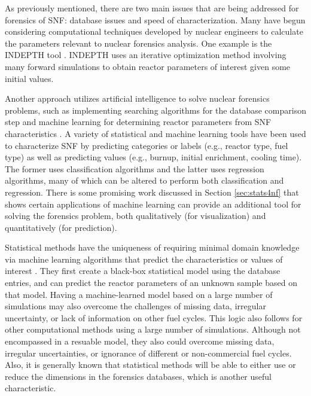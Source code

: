 As previously mentioned, there are two main issues that are being addressed for
forensics of \gls{SNF}: database issues and speed of characterization.  Many
have begun considering computational techniques developed by nuclear engineers
to calculate the parameters relevant to nuclear forensics analysis.  One
example is the \gls{INDEPTH} tool \cite{weber_2006, weber_2010, weber_2011}.
\gls{INDEPTH} uses an iterative optimization method involving many forward
simulations to obtain reactor parameters of interest given some initial values. 

Another approach utilizes artificial intelligence to solve nuclear forensics
problems, such as implementing searching algorithms for the database comparison
step \cite{gey_search} and machine learning for determining reactor parameters
from \gls{SNF} characteristics \cite{dayman_feasibility_2013, nicolaou_2006,
nicolaou_2009, nicolaou_2014, robel_2009, pu_discrimination, jones_viz_2014,
jones_snf_2014}.  A variety of statistical and machine learning tools have been
used to characterize \gls{SNF} by predicting categories or labels (e.g.,
reactor type, fuel type) as well as predicting values (e.g., burnup, initial
enrichment, cooling time). The former uses classification algorithms and the
latter uses regression algorithms, many of which can be altered to perform both
classification and regression.  There is some promising work discussed in
Section \ref{sec:stats4nf} that shows certain applications of machine learning
can provide an additional tool for solving the forensics problem, both
qualitatively (for visualization) and quantitatively (for prediction).

Statistical methods have the uniqueness of requiring minimal domain knowledge
via machine learning algorithms that predict the characteristics or values of
interest \cite{dayman_feasibility_2013, robel_2009, nicolaou_2006,
nicolaou_2009, nicolaou_2014, jones_snf_2014, jones_viz_2014}.  They first
create a black-box statistical model using the database entries, and can
predict the reactor parameters of an unknown sample based on that model.
Having a machine-learned model based on a large number of simulations may also
overcome the challenges of missing data, irregular uncertainty, or lack of
information on other fuel cycles.  This logic also follows for other
computational methods using a large number of simulations.  Although not
encompassed in a resuable model, they also could overcome missing data,
irregular uncertainties, or ignorance of different or non-commercial fuel
cycles.  Also, it is generally known that statistical methods will be able to
either use or reduce the dimensions in the forensics databases, which is
another useful characteristic.
